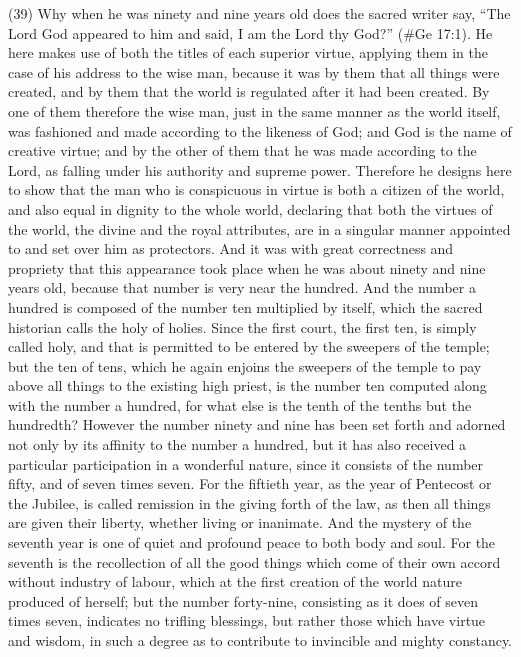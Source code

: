 (39) Why when he was ninety and nine years old does the sacred writer say, ``The Lord God
appeared to him and said, I am the Lord thy God?'' (\#Ge 17:1). He here makes use of both the
titles of each superior virtue, applying them in the case of his address to the wise man, because it
was by them that all things were created, and by them that the world is regulated after it had been
created. By one of them therefore the wise man, just in the same manner as the world itself, was
fashioned and made according to the likeness of God; and God is the name of creative virtue; and
by the other of them that he was made according to the Lord, as falling under his authority and
supreme power. Therefore he designs here to show that the man who is conspicuous in virtue is
both a citizen of the world, and also equal in dignity to the whole world, declaring that both the
virtues of the world, the divine and the royal attributes, are in a singular manner appointed to and
set over him as protectors. And it was with great correctness and propriety that this appearance
took place when he was about ninety and nine years old, because that number is very near the
hundred. And the number a hundred is composed of the number ten multiplied by itself, which the
sacred historian calls the holy of holies. Since the first court, the first ten, is simply called holy, and
that is permitted to be entered by the sweepers of the temple; but the ten of tens, which he again
enjoins the sweepers of the temple to pay above all things to the existing high priest, is the number
ten computed along with the number a hundred, for what else is the tenth of the tenths but the
hundredth? However the number ninety and nine has been set forth and adorned not only by its
affinity to the number a hundred, but it has also received a particular participation in a wonderful
nature, since it consists of the number fifty, and of seven times seven. For the fiftieth year, as the
year of Pentecost or the Jubilee, is called remission in the giving forth of the law, as then all things
are given their liberty, whether living or inanimate. And the mystery of the seventh year is one of
quiet and profound peace to both body and soul. For the seventh is the recollection of all the good
things which come of their own accord without industry of labour, which at the first creation of the
world nature produced of herself; but the number forty-nine, consisting as it does of seven times
seven, indicates no trifling blessings, but rather those which have virtue and wisdom, in such a
degree as to contribute to invincible and mighty constancy.

